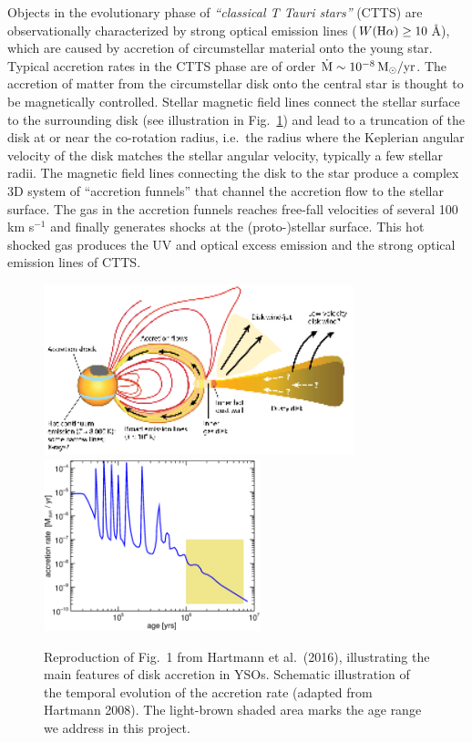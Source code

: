 \documentclass[10pt,fleqn,twoside]{article}
\begin{document}
Objects in the evolutionary phase of {\em ``classical T Tauri stars''}
(CTTS) are observationally characterized by strong optical emission lines 
($W({\rm H}\alpha) \ge 10$\,\AA), which are caused by accretion of 
circumstellar material onto the young star.
Typical accretion rates in the CTTS phase are of order
$\dot{\rm M} \sim 10^{-8}\,\rm M_\odot/yr$.
%
The accretion of matter from the circumstellar disk onto the
central star is thought to be magnetically controlled.
Stellar
magnetic field lines connect the stellar surface to
the surrounding disk (see illustration in Fig.~\ref{hartmann.fig})
and lead to a truncation of the
disk at or near the co-rotation radius, i.e.~the radius
where the Keplerian angular velocity of the disk
matches the stellar angular velocity, typically a few stellar radii. 
The magnetic field lines connecting the disk to the star
produce a complex 3D system of ``accretion funnels''
that channel the accretion flow to the stellar surface.
The gas in the accretion funnels reaches free-fall velocities
of several 100 km s$^{-1}$ and finally generates shocks at the
(proto-)stellar surface. 
This hot shocked gas produces the UV and
optical excess emission 
and the strong optical emission lines of CTTS.


\begin{figure} %
\centering
\includegraphics[width=9.0cm]{accretion-hartmann-scetch.eps}\hspace{1mm}
\includegraphics[width=6.3cm,clip=true]{Mdot-hartmann.eps}
\caption{ Reproduction of Fig.~1 from Hartmann et al.~(2016),
illustrating the main features of disk accretion in YSOs.
 Schematic illustration of the temporal evolution of the accretion rate
(adapted from Hartmann 2008). The light-brown shaded area marks the age range
we address in this project.
\label{hartmann.fig}}
\end{figure} %
\end{document}
